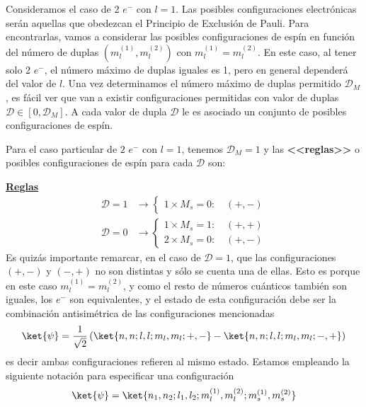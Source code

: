 
\renewcommand{\arraystretch}{1.5}
Consideramos el caso de 2 $e^-$ con  $l=1$. Las posibles 
configuraciones electrónicas serán aquellas que 
obedezcan el Principio de Exclusión de Pauli. Para 
encontrarlas, vamos a considerar las posibles 
configuraciones de espín  en función del 
número de duplas $(m_{l}^{(1)},m_{l}^{(2)})$ con $m_{l}^{(1)}=m_{l}^{(2)}$.
En este caso, al tener solo 2 $e^-$, el número máximo 
de duplas iguales es 1, pero en general dependerá del valor de  $l$. 
Una vez determinamos el número máximo de duplas 
permitido $\mathcal{D}_{M}$, es fácil ver que van a 
existir configuraciones permitidas con valor de
duplas $\mathcal{D}\in [0,\mathcal{D}_{M}]$. A cada valor de dupla $\mathcal{D}$ 
le es asociado un conjunto de posibles configuraciones de 
espín.\par 
Para el caso particular de $2$  $e^-$ con  $l=1$, 
tenemos  $\mathcal{D}_{M}=1$ y las \textbf{<<reglas>>} o 
posibles configuraciones de espín para 
cada $\mathcal{D}$ son:\par 
\underline{\textbf{Reglas}}
\begin{align*}
  \mathcal{D}=1&\longrightarrow \begin{cases}
    1\times M_{s}=0:\quad (+,-)
  \end{cases}\\
    \mathcal{D}=0&\longrightarrow \begin{cases}
      1\times M_{s}=1:\quad (+,+)\\
      2\times M_{s}=0:\quad (+,-)
    \end{cases}
\end{align*}
Es quizás importante remarcar, en el caso de $\mathcal{D}=1$, 
que las configuraciones $(+,-)$ y $(-,+)$ no son distintas 
y sólo se cuenta una de ellas. Esto es porque en este
caso  $m_{l}^{(1)}=m_{l}^{(2)}$, y como el resto de 
números cuánticos también son iguales, los 
$e^-$ son equivalentes, y el estado 
de esta configuración debe ser la combinación antisimétrica de las configuraciones mencionadas 
 \begin{align}
  \ket{\psi} = \frac{1}{\sqrt{2}}\left(\ket{n,n;l,l;m_{l},m_{l};+,-}-\ket{n,n;l,l;m_{l},m_{l};-,+} \right) 
\end{align}
es decir ambas configuraciones refieren al mismo estado. 
Estamos empleando la siguiente notación para 
especificar una configuración 
\begin{align*}
  \ket{\psi} = \ket{n_{1},n_{2};l_{1},l_{2};m_{l}^{(1)},m_{l}^{(2)};m_{s}^{(1)},m_{s}^{(2)}}
\end{align*}
